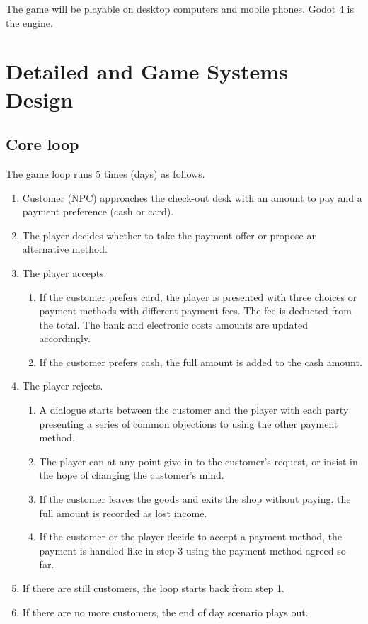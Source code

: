 \documentclass[a4paper,11pt]{article}
\begin{document}
The game will be playable on desktop computers and mobile phones. Godot
4 is the engine.

\section{Detailed and Game Systems
Design}\label{detailed-and-game-systems-design}

\subsection{Core loop}\label{core-loop}

The game loop runs 5 times (days) as follows.

\begin{enumerate}
\def\labelenumi{\arabic{enumi}.}
\item
  Customer (NPC) approaches the check-out desk with an amount to pay and
  a payment preference (cash or card).
\item
  The player decides whether to take the payment offer or propose an
  alternative method.
\item
  The player accepts.

  \begin{enumerate}
  \def\labelenumii{\arabic{enumii}.}
  \item
    If the customer prefers card, the player is presented with three
    choices or payment methods with different payment fees. The fee is
    deducted from the total. The bank and electronic costs amounts are
    updated accordingly.
  \item
    If the customer prefers cash, the full amount is added to the cash
    amount.
  \end{enumerate}
\item
  The player rejects.

  \begin{enumerate}
  \def\labelenumii{\arabic{enumii}.}
  \item
    A dialogue starts between the customer and the player with each
    party presenting a series of common objections to using the other
    payment method.
  \item
    The player can at any point give in to the customer's request, or
    insist in the hope of changing the customer's mind.
  \item
    If the customer leaves the goods and exits the shop without paying,
    the full amount is recorded as lost income.
  \item
    If the customer or the player decide to accept a payment method, the
    payment is handled like in step 3 using the payment method agreed so
    far.
  \end{enumerate}
\item
  If there are still customers, the loop starts back from step 1.
\item
  If there are no more customers, the end of day scenario plays out.


\end{enumerate}
\end{document}
